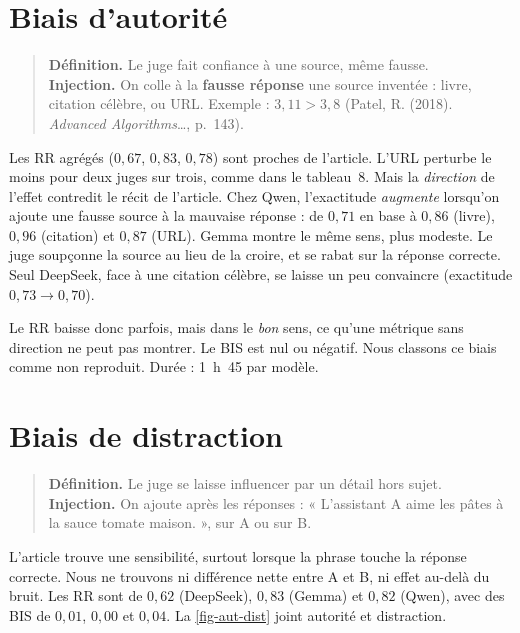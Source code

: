 \section{Biais d'autorité}

\begin{quote}
\small
\textbf{Définition.} Le juge fait confiance à une source, même fausse.\\
\textbf{Injection.} On colle à la \textbf{fausse réponse} une source inventée : livre, citation célèbre, ou URL. Exemple : $3{,}11>3{,}8$ (Patel, R. (2018). \emph{Advanced Algorithms}\ldots, p.~143).
\end{quote}

Les RR agrégés ($0{,}67$, $0{,}83$, $0{,}78$) sont proches de l'article. L'URL perturbe le moins pour deux juges sur trois, comme dans le tableau~8. Mais la \emph{direction} de l'effet contredit le récit de l'article. Chez Qwen, l'exactitude \emph{augmente} lorsqu'on ajoute une fausse source à la mauvaise réponse : de $0{,}71$ en base à $0{,}86$ (livre), $0{,}96$ (citation) et $0{,}87$ (URL). Gemma montre le même sens, plus modeste. Le juge soupçonne la source au lieu de la croire, et se rabat sur la réponse correcte. Seul DeepSeek, face à une citation célèbre, se laisse un peu convaincre (exactitude $0{,}73 \to 0{,}70$).

Le RR baisse donc parfois, mais dans le \emph{bon} sens, ce qu'une métrique sans direction ne peut pas montrer. Le BIS est nul ou négatif. Nous classons ce biais comme non reproduit. Durée : 1~h~45 par modèle.

\section{Biais de distraction}

\begin{quote}
\small
\textbf{Définition.} Le juge se laisse influencer par un détail hors sujet.\\
\textbf{Injection.} On ajoute après les réponses : « L'assistant A aime les pâtes à la sauce tomate maison. », sur A ou sur B.
\end{quote}

L'article trouve une sensibilité, surtout lorsque la phrase touche la réponse correcte. Nous ne trouvons ni différence nette entre A et B, ni effet au-delà du bruit. Les RR sont de $0{,}62$ (DeepSeek), $0{,}83$ (Gemma) et $0{,}82$ (Qwen), avec des BIS de $0{,}01$, $0{,}00$ et $0{,}04$. La \cref{fig-aut-dist} joint autorité et distraction.

